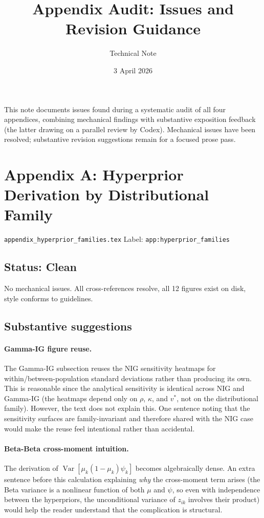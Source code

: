 \documentclass[11pt,a4paper]{article}
\title{Appendix Audit: Issues and Revision Guidance}
\author{Technical Note}
\date{3 April 2026}
\begin{document}
\maketitle

This note documents issues found during a systematic audit of all four
appendices, combining mechanical findings with substantive exposition
feedback (the latter drawing on a parallel review by Codex). Mechanical
issues have been resolved; substantive revision suggestions remain for a
focused prose pass.

\section{Appendix A: Hyperprior Derivation by Distributional Family}

\texttt{appendix\_hyperprior\_families.tex} \hfill Label:
\texttt{app:hyperprior\_families}

\subsection{Status: Clean}

No mechanical issues. All cross-references resolve, all 12 figures exist
on disk, style conforms to guidelines.

\subsection{Substantive suggestions}

\paragraph{Gamma-IG figure reuse.}
The Gamma-IG subsection reuses the NIG sensitivity heatmaps for
within/between-population standard deviations rather than producing its
own. This is reasonable since the analytical sensitivity is identical
across NIG and Gamma-IG (the heatmaps depend only on $\rho$, $\kappa$,
and $v^*$, not on the distributional family). However, the text does not
explain this. One sentence noting that the sensitivity surfaces are
family-invariant and therefore shared with the NIG case would make the
reuse feel intentional rather than accidental.

\paragraph{Beta-Beta cross-moment intuition.}
The derivation of $\operatorname{Var}[\mu_k(1-\mu_k)\psi_k]$ becomes algebraically
dense. An extra sentence before this calculation explaining \emph{why}
the cross-moment term arises (the Beta variance is a nonlinear function
of both $\mu$ and $\psi$, so even with independence between the
hyperpriors, the unconditional variance of $z_{ik}$ involves their
product) would help the reader understand that the complication is
structural.
\end{document}
